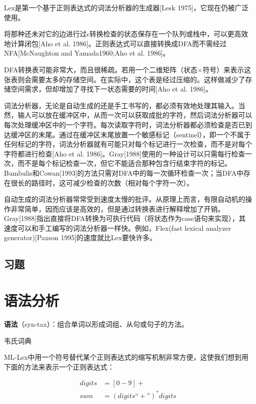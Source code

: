 \documentclass[cn,11pt,chinese]{elegantbook}
\begin{document}
Lex是第一个基于正则表达式的词法分析器的生成器[Lesk 1975]，它现在仍被广泛使用。

将那种还未对它的边进行过$\epsilon$转换检查的状态保存在一个队列或栈中，可以更高效地计算闭包[Aho et al. 1986]。正则表达式可以直接转换成DFA而不需经过NFA[McNaughton and Yamada1960;Aho et al. 1986]。

DFA转换表可能非常大，而且很稀疏。若用一个二维矩阵（状态$\times$符号）来表示这张表则会需要太多的存储空间。在实际中，这个表是经过压缩的。这样做减少了存储空间需求，但却增加了寻找下一状态需要的时间[Aho et al. 1986]。

词法分析器，无论是自动生成的还是手工书写的，都必须有效地处理其输入。当然，输人可以放在缓冲区中，从而一次可以获取成批的字符，然后词法分析器可以每次处理缓冲区中的一个字符。每次读取字符时，词法分析器都必须检查是否已到达缓冲区的末尾。通过在缓冲区末尾放置一个敏感标记（sentinel），即一个不属于任何标记的字符，词法分析器就有可能只对每个标记进行一次检查，而不是对每个字符都进行检查[Aho et al. 1986]。Gray[1988]使用的一种设计可以只需每行检查一次，而不是每个标记检查一次，但它不能适合那种包含行结束字符的标记。Bumbulis和Cowan[1993]的方法只需对DFA中的每一次循环检查一次；当DFA中存在很长的路径时，这可减少检查的次数（相对每个字符一次）。

自动生成的词法分析器常常受到速度太慢的批评。从原理上而言，有限自动机的操作非常简单，因而应该是高效的，但是通过转换表进行解释增加了开销。Gray[1988]指出直接将DFA转换为可执行代码（将状态作为case语句来实现），其速度可以和手工编写的词法分析器一样快。例如，Flex(fast lexical analyzer generator)[Paxson 1995]的速度就比Lex要快许多。

\section{习题}

\chapter{语法分析}

\epigraph{\textbf{语法}（syn-tax）：组合单词以形成词组、从句或句子的方法。}{韦氏词典}

ML-Lex中用一个符号替代某个正则表达式的缩写机制非常方便，这使我们想到用下面的方法来表示一个正则表达式：

\begin{align*}
digits &= [0-9]+ \\
sum &= (digits\text{``}+\text{''})^*digits
\end{align*}
\end{document}
